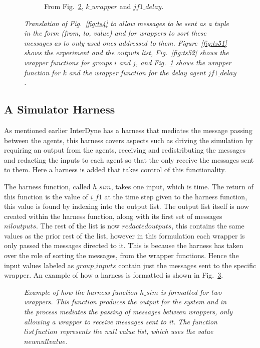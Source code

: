 \documentclass{article}
\begin{document}
\begin{figure}[H]\ContinuedFloat
	\centering
	\begin{subfigure}[b]{1\textwidth}
	
	\caption{From Fig.~\ref{fig:ts5}, $k\_wrapper$ and $jf1\_delay$.}
        \label{fig:ts53}
	\end{subfigure}
	\caption{\it Translation of Fig.~\ref{fig:ts4} to allow messages to be sent as a tuple in the form (from, to, value) and for wrappers to sort these messages as to only used ones addressed to them. Figure~\ref{fig:ts51} shows the experiment and the outputs list, Fig.~\ref{fig:ts52} shows the wrapper functions for groups $i$ and $j$, and Fig.~\ref{fig:ts53} shows the wrapper function for $k$ and the wrapper function for the delay agent $jf1\_delay$.}
	\label{fig:ts5}
\end{figure} 



\subsection{A Simulator Harness}
As mentioned earlier InterDyne has a harness that mediates the message passing between the agents, this harness covers aspects such as driving the simulation by requiring an output from the agents, receiving and redistributing the messages and redacting the inputs to each agent so that the only receive the messages sent to them. Here a harness is added that takes control of this functionality. 

The harness function, called $h\_sim$, takes one input, which is time. The return of this function is the value of $i\_f1$ at the time step given to the harness function, this value is found by indexing into the output list. The output list itself is now created within the harness function, along with its first set of messages $niloutputs$. The rest of the list is now $redactedoutputs$, this contains the same values as the prior rest of the list, however in this formulation each wrapper is only passed the messages directed to it. This is because the harness has taken over the role of sorting the messages, from the wrapper functions. Hence the input values labeled as $group\_inputs$ contain just the messages sent to the specific wrapper. An example of how a harness is formatted is shown in Fig.~\ref{fig:harn6}.
\begin{figure}[H]
	\centering
	
	\caption{\it Example of how the harness function $h\_sim$ is formatted for two wrappers. This function produces the output for the system and in the process mediates the passing of messages between wrappers, only allowing a wrapper to receive messages sent to it. The function $listfuction$ represents the null value list, which uses the value $newnullvalue$.}
	\label{fig:harn6}
\end{figure} 
\end{document}
